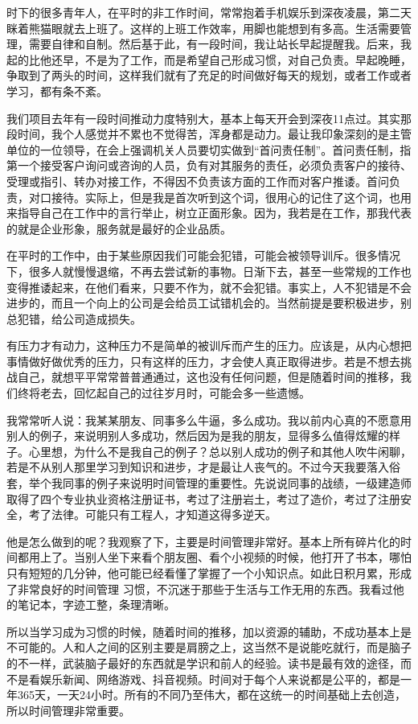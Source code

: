 \documentclass[
]{book}
\begin{document}
时下的很多青年人，在平时的非工作时间，常常抱着手机娱乐到深夜凌晨，第二天眯着熊猫眼就去上班了。这样的上班工作效率，用脚也能想到有多高。生活需要管理，需要自律和自制。然后基于此，有一段时间，我让站长早起提醒我。后来，我起的比他还早，不是为了工作，而是希望自己形成习惯，对自己负责。早起晚睡，争取到了两头的时间，这样我们就有了充足的时间做好每天的规划，或者工作或者学习，都有条不紊。

我们项目去年有一段时间推动力度特别大，基本上每天开会到深夜11点过。其实那段时间，我个人感觉并不累也不觉得苦，浑身都是动力。最让我印象深刻的是主管单位的一位领导，在会上强调机关人员要切实做到``首问责任制''。首问责任制，指第一个接受客户询问或咨询的人员，负有对其服务的责任，必须负责客户的接待、受理或指引、转办对接工作，不得因不负责该方面的工作而对客户推诿。首问负责，对口接待。实际上，但是我是首次听到这个词，很用心的记住了这个词，也用来指导自己在工作中的言行举止，树立正面形象。因为，我若是在工作，那我代表的就是企业形象，服务就是最好的企业品质。

在平时的工作中，由于某些原因我们可能会犯错，可能会被领导训斥。很多情况下，很多人就慢慢退缩，不再去尝试新的事物。日渐下去，甚至一些常规的工作也变得推诿起来，在他们看来，只要不作为，就不会犯错。事实上，人不犯错是不会进步的，而且一个向上的公司是会给员工试错机会的。当然前提是要积极进步，别总犯错，给公司造成损失。

有压力才有动力，这种压力不是简单的被训斥而产生的压力。应该是，从内心想把事情做好做优秀的压力，只有这样的压力，才会使人真正取得进步。若是不想去挑战自己，就想平平常常普普通通过，这也没有任何问题，但是随着时间的推移，我们终将老去，回忆起自己的过往岁月时，可能会多一些遗憾。

我常常听人说：我某某朋友、同事多么牛逼，多么成功。我以前内心真的不愿意用别人的例子，来说明别人多成功，然后因为是我的朋友，显得多么值得炫耀的样子。心里想，为什么不是我自己的例子？总以别人成功的例子和其他人吹牛闲聊，若是不从别人那里学习到知识和进步，才是最让人丧气的。不过今天我要落入俗套，举个我同事的例子来说明时间管理的重要性。先说说同事的战绩，一级建造师取得了四个专业执业资格注册证书，考过了注册岩土，考过了造价，考过了注册安全，考了法律。可能只有工程人，才知道这得多逆天。

他是怎么做到的呢？我观察了下，主要是时间管理非常好。基本上所有碎片化的时间都用上了。当别人坐下来看个朋友圈、看个小视频的时候，他打开了书本，哪怕只有短短的几分钟，他可能已经看懂了掌握了一个小知识点。如此日积月累，形成了非常良好的时间管理 习惯，不沉迷于那些于生活与工作无用的东西。我看过他的笔记本，字迹工整，条理清晰。

所以当学习成为习惯的时候，随着时间的推移，加以资源的辅助，不成功基本上是不可能的。人和人之间的区别主要是肩膀之上，这当然不是说能吃就行，而是脑子的不一样，武装脑子最好的东西就是学识和前人的经验。读书是最有效的途径，而不是看娱乐新闻、网络游戏、抖音视频。时间对于每个人来说都是公平的，都是一年365天，一天24小时。所有的不同乃至伟大，都在这统一的时间基础上去创造，所以时间管理非常重要。
\end{document}
